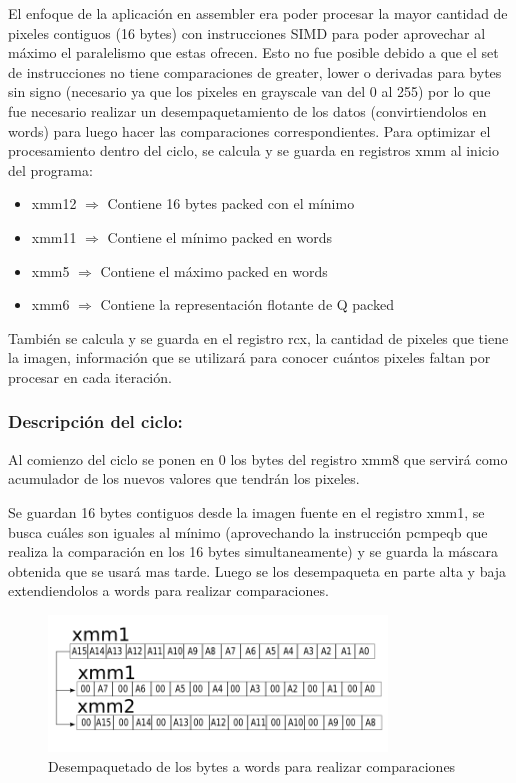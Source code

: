 El enfoque de la aplicación en assembler era poder procesar la mayor cantidad de pixeles contiguos (16 bytes) con instrucciones SIMD para poder aprovechar al máximo el paralelismo que estas ofrecen. Esto no fue posible debido a que el set de instrucciones no tiene comparaciones de greater, lower o derivadas para bytes sin signo (necesario ya que los pixeles en grayscale van del 0 al 255) por lo que fue necesario realizar un desempaquetamiento de los datos (convirtiendolos en words) para luego hacer las comparaciones correspondientes.
Para optimizar el procesamiento dentro del ciclo, se calcula y se guarda en registros xmm al inicio del programa:
\begin{itemize}
  \item xmm12 $\Rightarrow$ Contiene 16 bytes packed con el mínimo
  \item xmm11 $\Rightarrow$ Contiene el mínimo packed en words
  \item xmm5 $\Rightarrow$ Contiene el máximo packed en words
  \item xmm6 $\Rightarrow$ Contiene la representación flotante de Q packed
\end{itemize}

También se calcula y se guarda en el registro rcx, la cantidad de pixeles que tiene la imagen, información que se utilizará para conocer cuántos pixeles faltan por procesar en cada iteración.

\subsubsection{Descripción del ciclo:}
Al comienzo del ciclo se ponen en 0 los bytes del registro xmm8 que servirá como acumulador de los nuevos valores que tendrán los pixeles.

Se guardan 16 bytes contiguos desde la imagen fuente en el registro xmm1, se busca cuáles son iguales al mínimo (aprovechando la instrucción pcmpeqb que realiza la comparación en los 16 bytes simultaneamente) y se guarda la máscara obtenida que se usará mas tarde. Luego se los desempaqueta en parte alta y baja extendiendolos a words para realizar comparaciones.

\begin{figure}[H]
\centering
\includegraphics[width=90mm]{unpackxmm1.png}
\caption{Desempaquetado de los bytes a words para realizar comparaciones}
\label{overflow}
\end{figure}

